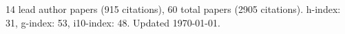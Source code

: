 14 lead author papers (915 citations),
60 total papers (2905 citations).\newline
h-index: 31, g-index: 53, i10-index: 48. Updated \today.